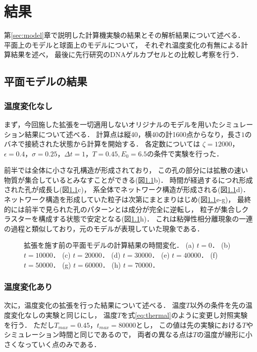 \chapter{結果}
\label{sec:result}

第\ref{sec:model}章で説明した計算機実験の結果とその解析結果について述べる．
平面上のモデルと球面上のモデルについて，
それぞれ温度変化の有無による計算結果を述べ，
最後に先行研究のDNAゲルカプセルとの比較し考察を行う．


\section{平面モデルの結果}


\subsection{温度変化なし}
まず，今回施した拡張を一切適用しないオリジナルのモデルを用いたシミュレーション結果について述べる．
計算点は縦40，横40の計1600点からなり，長さ$1$のバネで接続された状態から計算を開始する．
各定数については
$\zeta=12000$，$\epsilon=0.4$，$\sigma=0.25$，$\Delta t=1$，$T=0.45, E_0=6.5$の条件で実験を行った．

前半では全体に小さな孔構造が形成されており，
この孔の部分には拡散の速い物質が集合しているとみなすことができる(図\ref{fig:result_2d_without_anearing}b)．
時間が経過するにつれ形成された孔が成長し(図\ref{fig:result_2d_without_anearing}c)，
系全体でネットワーク構造が形成される(図\ref{fig:result_2d_without_anearing}d)．
ネットワーク構造を形成していた粒子は次第にまとまりはじめ(図\ref{fig:result_2d_without_anearing}e-g)，
最終的には前半で見られた孔のパターンとは成分が完全に逆転し，
粒子が集合しクラスターを構成する状態で安定となる(図\ref{fig:result_2d_without_anearing}h)．
これは粘弾性相分離現象の一連の過程と類似しており，元のモデルが表現していた現象である．
\begin{figure}
    \centering
    
    \caption{
        拡張を施す前の平面モデルの計算結果の時間変化．
        (a) $t=0$．
        (b) $t=10000$．
        (c) $t=20000$．
        (d) $t=30000$．
        (e) $t=40000$．
        (f) $t=50000$．
        (g) $t=60000$．
        (h) $t=70000$．
    }
    \label{fig:result_2d_without_anearing}
\end{figure}


\subsection{温度変化あり}
次に，温度変化の拡張を行った結果について述べる．
温度$T$以外の条件を先の温度変化なしの実験と同じにし，
温度$T$を式\ref{eq:thermal}のように変更し対照実験を行う．
ただし$T_{max}=0.45$，$t_{max}=80000$とし，
この値は先の実験における$T$やシミュレーション時間と同じであるので，
両者の異なる点は$T$の温度が線形に小さくなっていく点のみである．

